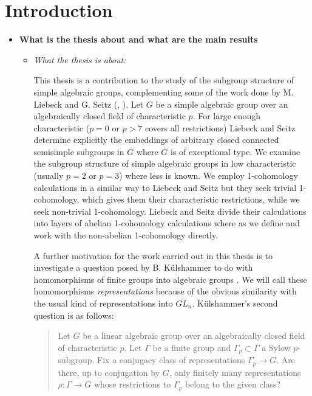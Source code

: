 
\chapter{Introduction}
\label{Chapter1}

\begin{itemize}
	\item[] \textbf{What is the thesis about and what are the main results}
	\begin{itemize}
		\item \emph{What the thesis is about:}
	
		This thesis is a contribution to the study of the subgroup structure of simple algebraic groups, complementing some of the work done by M. Liebeck and G. Seitz (\cite{liebeck1996reductive}, \cite{liebeck2004maximal}). Let $G$ be a simple algebraic group over an algebraically closed field of characteristic $p$. For large enough characteristic ($p=0$ or $p>7$ covers all restrictions) Liebeck and Seitz determine explicitly the embeddings of arbitrary closed connected semisimple subgroups in $G$ where $G$ is of exceptional type. We examine the subgroup structure of simple algebraic groups in low characteristic (usually $p=2$ or $p=3$) where less is known. We employ 1-cohomology calculations in a similar way to Liebeck and Seitz but they seek trivial 1-cohomology, which gives them their characteristic restrictions, while we seek non-trivial 1-cohomology. Liebeck and Seitz divide their calculations into layers of abelian 1-cohomology calculations where as we define and work with the non-abelian 1-cohomology directly.
		
		
		A further motivation for the work carried out in this thesis is to investigate a question posed by B. K\"ulshammer to do with homomorphisms of finite groups into algebraic groups \cite{weil1964remarks}. We will call these homomorphisms \emph{representations} because of the obvious similarity with the usual kind of representations into $GL_n$. K\"ulshammer's second question is as follows:
		\begin{quote}
		Let $G$ be a linear algebraic group over an algebraically closed field of characteristic $p$. Let $\Gamma$ be a finite group and $\Gamma_p\subset\Gamma$ a Sylow $p$-subgroup. Fix a conjugacy class of representations $\Gamma_p\rightarrow G$. Are there, up to conjugation by $G$, only finitely many representations $\rho:\Gamma\rightarrow G$ whose restrictions to $\Gamma_p$ belong to the given class?
		\end{quote}
		

\end{itemize}
\end{itemize}
